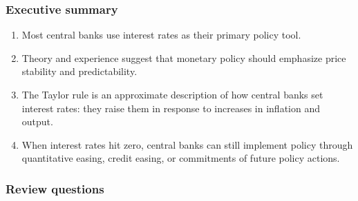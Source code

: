 \documentclass[letterpaper,12pt]{article}
\begin{document}
\subsubsection*{Executive summary}

\begin{enumerate}
\item Most central banks use interest rates as their primary policy tool.

\item Theory and experience suggest that monetary policy 
should emphasize price stability and predictability.

\item The Taylor rule is an approximate description of how
central banks set interest rates:
they raise them in response to
increases in inflation and output.

\item When interest rates hit zero, central banks can still implement 
policy through quantitative easing, credit easing, or 
commitments of future policy actions.  
\end{enumerate}


\subsubsection*{Review questions}
\end{document}
